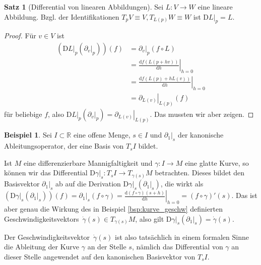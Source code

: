 \documentclass[a4paper]{scrreprt}
\numberwithin{equation}{chapter}
\newcommand{\D}{\mathrm{d}}
\newcommand{\DD}{\mathrm{D}}
\theoremstyle{definition}
\newtheorem{satz}[defn]{Satz}
\newtheorem{bsp}[defn]{Beispiel}
\begin{document}
\begin{satz}[Differential von linearen Abbildungen]
	Sei $L\colon V \to W$ eine lineare Abbildung. Bzgl. der Identifikationen $T_pV \equiv V, T_{L(p)}W \equiv W$ ist $\left.\DD L\right|_p = L$.

	\begin{center}
	\end{center}

	\begin{proof}
		Für $v\in V$ ist
		\begin{align*}
			\left(\left.\DD L\right|_p \left( \left.\partial_v\right|_p \right)\right) (f) &= \left.\partial_v\right|_p (f \circ L)\\
			&= \left.\frac{\D f(L(p + h v))}{\D h}\right|_{h=0}\\
			&= \left.\frac{\D f(L(p) + h L(v))}{\D h}\right|_{h=0}\\
			&= \left.\partial_{L(v)}\right|_{L(p)} (f)
		\end{align*}
		für beliebige $f$, also $\left.\DD L\right|_p \left( \left.\partial_v\right|_p \right) = \left.\partial_{L(v)}\right|_{L(p)}$.
		Das mussten wir aber zeigen.
	\end{proof}
\end{satz}

\begin{bsp} \label{bsp:abl_kurve_differential}
	Sei $I \subset \mathbb R$ eine offene Menge, $s \in I$ und $\left.\partial_1\right|_s$ der kanonische Ableitungsoperator, der eine Basis von $T_s I$ bildet.

	Ist $M$ eine differenzierbare Mannigfaltigkeit und $\gamma\colon I \to M$ eine glatte Kurve, so können wir das Differential $\left.\DD \gamma\right|_s \colon T_sI \to T_{\gamma(s)} M$ betrachten. Dieses bildet den Basisvektor $\left.\partial_1\right|_s$ ab auf die Derivation $\left.\DD \gamma\right|_s(\left.\partial_1\right|_s)$, die wirkt als $\left(\left.\DD \gamma\right|_s(\left.\partial_1\right|_s)\right)(f) = \left.\partial_1\right|_s (f\circ\gamma) = \left.\frac{\D(f\circ\gamma)(s + h)}{\D h}\right|_{h=0} = (f\circ\gamma)'(s)$. Das ist aber genau die Wirkung des in Beispiel \ref{bsp:kurve_geschw} definierten \glqq Geschwindigkeitsvektors\grqq\ $\dot\gamma(s) \in T_{\gamma(s)} M$, also gilt $\left.\DD \gamma\right|_s(\left.\partial_1\right|_s) = \dot\gamma(s)$.

	Der \glqq Geschwindigkeitsvektor\grqq\ $\dot\gamma(s)$ ist also tatsächlich in einem formalen Sinne die Ableitung der Kurve $\gamma$ an der Stelle $s$, nämlich das Differential von $\gamma$ an dieser Stelle angewendet auf den kanonischen Basisvektor von $T_sI$.
\end{bsp}
\end{document}
